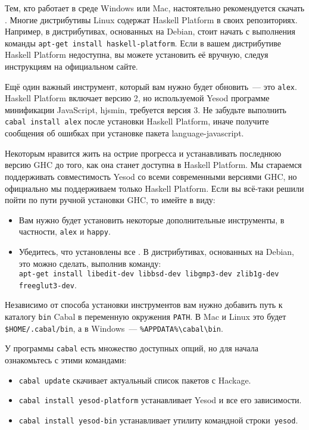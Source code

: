 Тем, кто работает в среде Windows или Mac, настоятельно рекомендуется скачать
. Многие
дистрибутивы Linux содержат Haskell Platform в своих репозиториях. Например, в
дистрибутивах, основанных на Debian, стоит начать с выполнения команды
\texttt{apt-get install haskell-platform}. Если в вашем дистрибутиве Haskell
Platform недоступна, вы можете установить её вручную, следуя инструкциям на
официальном сайте.

Ещё один важный инструмент, который вам нужно будет обновить~--- это
\texttt{alex}. Haskell Platform включает версию 2, но используемой Yesod
программе минификации JavaScript, hjsmin, требуется версия 3. Не забудьте
выполнить \texttt{cabal install alex} после установки Haskell Platform, иначе
получите сообщения об ошибках при установке пакета language-javascript.

\begin{remark}
Некоторым нравится жить на острие прогресса и устанавливать последнюю версию
GHC до того, как она станет доступна в Haskell Platform. Мы стараемся
поддерживать совместимость Yesod со всеми современными версиями GHC, но
официально мы поддерживаем только Haskell Platform. Если вы всё-таки решили
пойти по пути ручной установки GHC, то имейте в виду:

\begin{itemize}
  \item Вам нужно будет установить некоторые дополнительные инструменты, в
      частности, \texttt{alex} и \texttt{happy}.
  \item Убедитесь, что установлены все
      . В дистрибутивах, основанных на Debian, это можно
      сделать, выполнив команду:\\
 \texttt{apt-get install libedit-dev libbsd-dev libgmp3-dev zlib1g-dev freeglut3-dev}.
\end{itemize}
\end{remark}

Независимо от способа установки инструментов вам нужно добавить путь к каталогу
\texttt{bin} Cabal в переменную окружения \texttt{PATH}. В Mac и Linux это
будет \texttt{\$HOME/.cabal/bin}, а в Windows~---
\texttt{\%APPDATA\%\textbackslash{}cabal\textbackslash{}bin}.

У программы \texttt{cabal} есть множество доступных опций, но для начала
ознакомьтесь с этими командами:

\begin{itemize}
  \item \texttt{cabal update} скачивает актуальный список пакетов с Hackage.
  \item \texttt{cabal install yesod-platform} устанавливает Yesod и все его
      зависимости.
  \item \texttt{cabal install yesod-bin} устанавливает утилиту командной
      строки~\texttt{yesod}.
\end{itemize}

